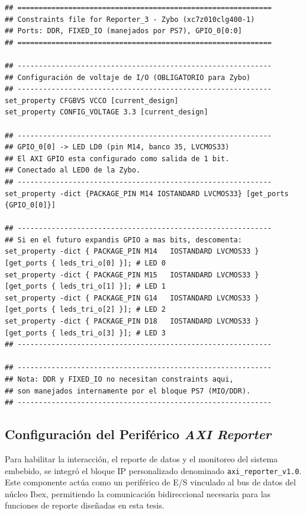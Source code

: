 \begin{lstlisting}[style=xdcstyle, basicstyle=\ttfamily\footnotesize, caption={Archivo de restricciones físicas (\texttt{.xdc}) para la placa Zybo.}, label={code:constraints_xdc}]
## ============================================================
## Constraints file for Reporter_3 - Zybo (xc7z010clg400-1)
## Ports: DDR, FIXED_IO (manejados por PS7), GPIO_0[0:0]
## ============================================================

## ------------------------------------------------------------
## Configuración de voltaje de I/O (OBLIGATORIO para Zybo)
## ------------------------------------------------------------
set_property CFGBVS VCCO [current_design]
set_property CONFIG_VOLTAGE 3.3 [current_design]

## ------------------------------------------------------------
## GPIO_0[0] -> LED LD0 (pin M14, banco 35, LVCMOS33)
## El AXI GPIO esta configurado como salida de 1 bit.
## Conectado al LED0 de la Zybo.
## ------------------------------------------------------------
set_property -dict {PACKAGE_PIN M14 IOSTANDARD LVCMOS33} [get_ports {GPIO_0[0]}]

## ------------------------------------------------------------
## Si en el futuro expandis GPIO a mas bits, descomenta:
set_property -dict { PACKAGE_PIN M14   IOSTANDARD LVCMOS33 } [get_ports { leds_tri_o[0] }]; # LED 0
set_property -dict { PACKAGE_PIN M15   IOSTANDARD LVCMOS33 } [get_ports { leds_tri_o[1] }]; # LED 1
set_property -dict { PACKAGE_PIN G14   IOSTANDARD LVCMOS33 } [get_ports { leds_tri_o[2] }]; # LED 2
set_property -dict { PACKAGE_PIN D18   IOSTANDARD LVCMOS33 } [get_ports { leds_tri_o[3] }]; # LED 3
## ------------------------------------------------------------

## ------------------------------------------------------------
## Nota: DDR y FIXED_IO no necesitan constraints aqui,
## son manejados internamente por el bloque PS7 (MIO/DDR).
## ------------------------------------------------------------
\end{lstlisting}



\subsection{Configuración del Periférico \textit{AXI Reporter}}
Para habilitar la interacción, el reporte de datos y el monitoreo del sistema embebido, se integró el bloque IP personalizado denominado \texttt{axi\_reporter\_v1.0}. Este componente actúa como un periférico de E/S vinculado al bus de datos del núcleo Ibex, permitiendo la comunicación bidireccional necesaria para las funciones de reporte diseñadas en esta tesis.

